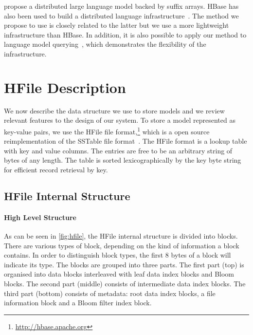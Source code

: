\citet{zhang-hildebrand-vogel:2006:EMNLP} propose a distributed large language
model backed by suffix arrays. HBase has also been used to build a distributed
language infrastructure~\citep{yu:2008:mastersthesis}. The method we propose to
use is closely related to the latter but we use a more lightweight
infrastructure than HBase. In addition, it is also possible to apply our method
to language model querying~\citep{pino-waite-byrne:2012:PBML}, which
demonstrates the flexibility of the infrastructure.

\section{HFile Description}
\label{sec:hfile}

We now describe the data structure we use to store models and we review relevant
features to the design of our system. To store a model represented as key-value
pairs, we use the HFile file format,\footnote{\url{http://hbase.apache.org}} which is
a open source reimplementation of the SSTable file
format~\citep{chang-dean-ghemawat-hsieh-wallach-burrows-chandra-fikes-gruber:2008:ACM}.
The HFile format is a lookup table with key and value columns. The entries are free
to be an arbitrary string of bytes of any length. The table is sorted
lexicographically by the key byte string for efficient record retrieval by key.

\subsection{HFile Internal Structure}


\paragraph{High Level Structure} As can be seen in \autoref{fig:hfile},
the HFile internal structure is divided into blocks. There are various types of
block, depending on the kind of information a block contains.
In order to
distinguish block types, the first 8 bytes of a
block will indicate its type. The blocks are grouped into
three parts. The first part (top) is organised into
data blocks interleaved with leaf data index blocks and Bloom blocks.
The second part (middle) consists of intermediate data index blocks.
The third part (bottom) consists of metadata: root data index blocks, a file
information block and a Bloom filter index block.

